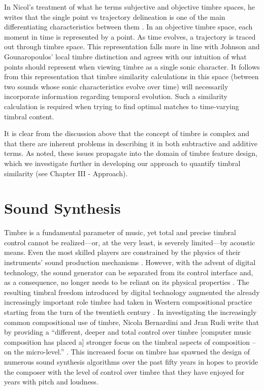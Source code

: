 \documentclass[12pt]{report} 	%
\numberwithin{figure}{chapter}
\numberwithin{table}{chapter}
\numberwithin{equation}{chapter}
\begin{document}
\begin{flushleft}
In Nicol's treatment of what he terms subjective and objective timbre spaces, he writes that the single point vs trajectory delineation is one of the main differentiating characteristics between them \cite[p. 56]{Nicol:2005rp}. In an objective timbre space, each moment in time is represented by a point. As time evolves, a trajectory is traced out through timbre space. This representation falls more in line with Johnson and Gounaropoulos' local timbre distinction \cite{Johnson:2006pi} and agrees with our intuition of what points should represent when viewing timbre as a single sonic character. It follows from this representation that timbre similarity calculations in this space (between two sounds whose sonic characteristics evolve over time) will necessarily incorporate information regarding temporal evolution. Such a similarity calculation is required when trying to find optimal matches to time-varying timbral content.

It is clear from the discussion above that the concept of timbre is complex and that there are inherent problems in describing it in both subtractive and additive terms. As noted, these issues propagate into the domain of timbre feature design, which we investigate further in developing our approach to quantify timbral similarity (see Chapter III - Approach).

\section{Sound Synthesis}

Timbre is a fundamental parameter of music, yet total and precise timbral control cannot be realized---or, at the very least, is severely limited---by acoustic means. Even the most skilled players are constrained by the physics of their instruments' sound production mechanisms \cite[p. 11]{Wessel:2002uk}. However, with the advent of digital technology, the sound generator can be separated from its control interface and, as a consequence, no longer needs to be reliant on its physical properties \cite[p. 1]{Malloch:2006jb}. The resulting timbral freedom introduced by digital technology augmented the already increasingly important role timbre had taken in Western compositional practice starting from the turn of the twentieth century \cite[p. 1]{Klingbeil:2009lo}. In investigating the increasingly common compositional use of timbre, Nicola Bernardini and Jran Rudi write that by providing a ``different, deeper and total control over timbre [computer music composition has placed a] stronger focus on the timbral aspects of composition -- on the micro-level.'' \cite[p. 3]{Bernardini:2001kc}. This increased focus on timbre has spawned the design of numerous sound synthesis algorithms over the past fifty years in hopes to provide the composer with the level of control over timbre that they have enjoyed for years with pitch and loudness.


\end{flushleft}
\end{document}
